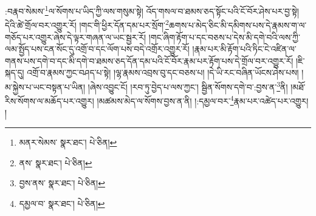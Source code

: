 :བརྣབ་སེམས་\footnote{མནར་སེམས་  སྣར་ཐང་།  པེ་ཅིན། }ལ་སོགས་པ་ཡིད་ཀྱི་ལས་གསུམ་སྟེ། འོད་གསལ་བ་ཐམས་ཅད་སྟོང་པའི་ངོ་བོར་ཤེས་པར་བྱ་སྟེ། དེའི་ཚེ་གྲོལ་བར་འགྱུར་རོ། །གང་གི་ཕྱིར་དོན་དམ་པར་སྲོག་\footnote{ནས་  སྣར་ཐང་།  པེ་ཅིན། }ཆགས་པ་མེད་ཅིང་མི་དམིགས་པས་དེ་རྣམས་ག་ལ་གཅོད་པར་འགྱུར་ཞེས་དེ་ལྟར་གཞན་ལ་ཡང་སྦྱར་རོ། །གང་ཞིག་རྟོག་པ་དང་བཅས་པ་དེས་མི་དགེ་བའི་ལས་ཀྱི་ལམ་སྤྱོད་པས་ངན་སོང་དུ་འགྲོ་བ་དང་ལོག་པས་བདེ་འགྲོར་འགྱུར་རོ། །རྣམ་པར་མི་རྟོག་པའི་ཏིང་ངེ་འཛིན་ལ་གནས་པས་དགེ་བ་དང་མི་དགེ་བ་ཐམས་ཅད་དོན་དམ་པའི་ངོ་བོར་རྣམ་པར་རྟོག་པས་དེ་གྲོལ་བར་འགྱུར་རོ། །ཇི་སྐད་དུ། འགྲོ་བ་རྣམས་ཀྱང་བཤད་པ་སྟེ། །ལྷ་རྣམས་འབྲས་བུ་དང་བཅས་པ། །དེ་ཡི་རང་བཞིན་ཡོངས་ཤེས་པས། །མ་སྐྱེས་པ་ཡང་བསྟན་པ་ཡིན། །ཞེས་འབྱུང་ངོ། །རབ་ཏུ་བྱེད་པ་ལས་ཀྱང་། སྦྱིན་སོགས་དགེ་བ་:བྱས་ན་\footnote{བྱས་ནས་  སྣར་ཐང་།  པེ་ཅིན། }ནི། །མཐོ་རིས་སོགས་ལ་མཆོད་པར་འགྱུར། །མཚམས་མེད་ལ་སོགས་བྱས་ན་ནི། །:དམྱལ་བར་\footnote{དམྱལ་བ་  སྣར་ཐང་།  པེ་ཅིན། }རྣམ་པར་འཚེད་པར་འགྱུར། །
